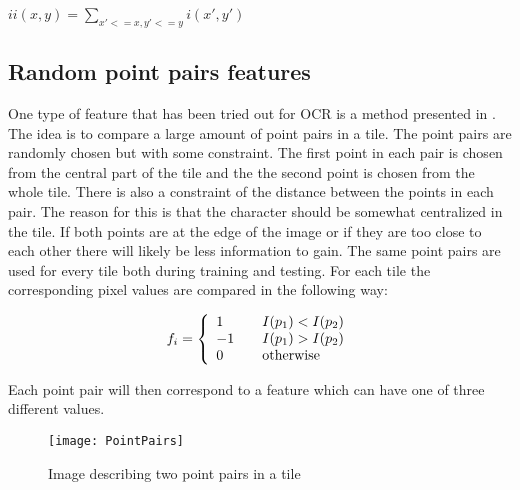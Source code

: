 \begin{center}
	$ii(x,y) = \sum_{x' <= x, y' <= y} i(x',y')$
\end{center}

\subsection{Random point pairs features}
\label{sec:Random point pairs features}
One type of feature that has been tried out for OCR is a method presented in \citep{Nenad}. The idea is to compare a large amount of point pairs in a tile. The point pairs are randomly chosen but with some constraint. The first point in each pair is chosen from the central part of the tile and the the second point is chosen from the whole tile. There is also a constraint of the distance between the points in each pair. The reason for this is that the character should be somewhat centralized in the tile. If both points are at the edge of the image or if they are too close to each other there will likely be less information to gain. The same point pairs are used for every tile both during training and testing. For each tile the corresponding pixel values are compared in the following way:
 \begin{center}
\[ f_i = \left\{ 
   \begin{array}{l l l}
     1 & \quad I(p_1)<I(p_2)\\
     -1 & \quad I(p_1)>I(p_2)\\
     0 & \quad \text{otherwise}
   \end{array} \right.\]
 \end{center}
Each point pair will then correspond to a feature which can have one of three different values. 
\begin{figure}[H]
\centering
	\texttt{[image: PointPairs]}
	\caption{Image describing two point pairs in a tile}
	\label{PointPairs}
\end{figure}


